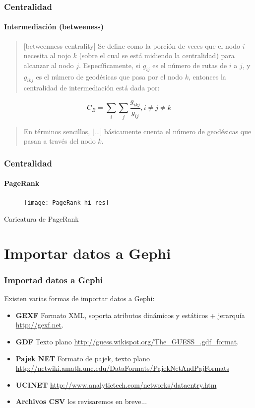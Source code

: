 \documentclass[10pt,handout]{beamer}
\begin{document}
\begin{frame}
\frametitle{Centralidad}
\framesubtitle{Intermediaci\'on (betweeness)}

\begin{quote}
[betweenness centrality] Se define como la porci\'on de veces que el nodo $i$ necesita al nojo $k$ (sobre
el cual se est\'a midiendo la centralidad) para alcanzar al nodo $j$.
Espec\'ificamente, si $g_{ij}$ es el n\'umero de rutas de $i$ a $j$, y $g_{ikj}$
es el n\'umero de geod\'esicas que pasa por el nodo $k$, entonces la centralidad
de intermediaci\'on est\'a dada por: 
\end{quote}

\begin{equation}
C_B=\sum_i\sum_j{\frac{g_{ikj}}{g_{ij}}}, i \neq j \neq k
\end{equation}

\begin{quote}
En t\'erminos sencillos, [...] b\'asicamente cuenta el n\'umero de geod\'esicas
que pasan a trav\'es del nodo $k$. \cite{borgatti2005centrality}
\end{quote}
\end{frame}

\begin{frame}
\frametitle{Centralidad}
\framesubtitle{PageRank}
\begin{figure}
\centering
\texttt{[image: PageRank-hi-res]}
\end{figure}
{\footnotesize Caricatura de PageRank}
\end{frame}

\section{Importar datos a Gephi}

\begin{frame}
\frametitle{Importad datos a Gephi}
Existen varias formas de importar datos a Gephi:
\begin{itemize}
\item {\bf GEXF} Formato XML, soporta atributos din\'amicos y est\'aticos + jerarqu\'ia \url{http://gexf.net}.
\item {\bf GDF} Texto plano \url{http://guess.wikispot.org/The_GUESS_.gdf_format}.
\item {\bf Pajek NET} Formato de pajek, texto plano \url{http://netwiki.amath.unc.edu/DataFormats/PajekNetAndPajFormats}
\item {\bf UCINET} \url{http://www.analytictech.com/networks/dataentry.htm}
\item {\bf Archivos CSV} los revisaremos en breve...
\end{itemize}
\end{frame}
\end{document}
